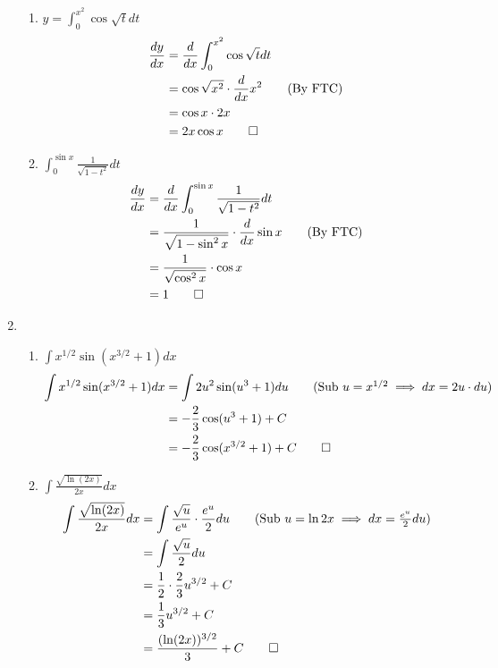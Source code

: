 \documentclass[12pt, a4paper]{article}
\begin{document}
\begin{enumerate}[Q\arabic*.]
\begin{enumerate}[(\alph*)]
    \item $\displaystyle y = \int^{x^2}_0 \cos \sqrt{t} dt$
      \begin{align*}
        \frac{dy}{dx} &= \frac{d}{dx}\int^{x^2}_0 \cos \sqrt{t} dt\\ 
                      &= \cos \sqrt{x^2} \cdot \frac{d}{dx} x^2\tag*{(By FTC)}\\
                      &= \cos x \cdot 2x\\
                      &= 2x\cos x \qed
      \end{align*}

    \item $\displaystyle \int^{\sin x}_0 \frac{1}{\sqrt{1-t^2}} dt$
      \begin{align*}
        \frac{dy}{dx} &= \frac{d}{dx} \int^{\sin x}_0 \frac{1}{\sqrt{1-t^2}} dt \\
                      &= \frac{1}{\sqrt{1-\sin^2x}} \cdot \frac{d}{dx}\sin x\tag*{(By FTC)}\\
                      &= \frac{1}{\sqrt{\cos^2x}} \cdot \cos x \\
                      &= 1 \qed
      \end{align*}
    \end{enumerate}

  \item 
    \begin{enumerate}[(\alph*)]
      \item $\displaystyle \int x^{1/2}\sin(x^{3/2}+1) dx$ 
      \begin{align*}
        \int x^{1/2}\sin(x^{3/2}+1) dx &= \int 2u^2\sin(u^3+1) du\tag*{(Sub $u = x^{1/2} \implies dx = 2u \cdot du$)}\\
                                       &= -\frac{2}{3}\cos(u^3+1) + C\\
                                       &= -\frac{2}{3}\cos(x^{3/2}+1) + C \qed
      \end{align*}

    \item $\displaystyle \int \frac{\sqrt{\ln(2x)}}{2x} dx$
      \begin{align*}
        \int \frac{\sqrt{\ln(2x)}}{2x} dx &= \int \frac{\sqrt{u}}{e^u} \cdot \frac{e^u}{2} du\tag*{(Sub $u = \ln 2x \implies dx = \frac{e^u}{2}du$)}\\
                                          &= \int \frac{\sqrt{u}}{2} du\\
                                          &= \frac{1}{2} \cdot \frac{2}{3} u^{3/2} + C\\
                                          &= \frac{1}{3}u^{3/2} + C\\
                                          &= \frac{(\ln(2x))^{3/2}}{3} + C \qed
      \end{align*}
    

\end{enumerate}
\end{enumerate}
\end{document}
